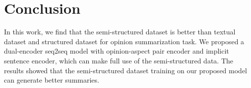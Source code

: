 \section{Conclusion}
\label{sec:conclude}
In this work,
we find that the semi-structured dataset is better than 
textual dataset and structured dataset for 
opinion summarization task.
We proposed a dual-encoder seq2seq model with opinion-aspect pair encoder and implicit sentence encoder, which can make full use of the semi-structured data.
The results showed that
the  semi-structured dataset training on our proposed model can generate better summaries.



